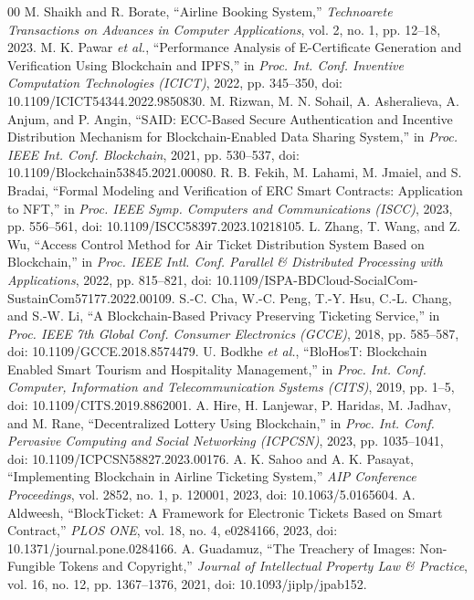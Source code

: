 \documentclass[conference]{IEEEtran}
\begin{document}
\begin{thebibliography}{00}
 M. Shaikh and R. Borate, ``Airline Booking System,'' \emph{Technoarete Transactions on Advances in Computer Applications}, vol. 2, no. 1, pp. 12--18, 2023.
 M. K. Pawar \emph{et al.}, ``Performance Analysis of E-Certificate Generation and Verification Using Blockchain and IPFS,'' in \emph{Proc. Int. Conf. Inventive Computation Technologies (ICICT)}, 2022, pp. 345--350, doi: 10.1109/ICICT54344.2022.9850830.
 M. Rizwan, M. N. Sohail, A. Asheralieva, A. Anjum, and P. Angin, ``SAID: ECC-Based Secure Authentication and Incentive Distribution Mechanism for Blockchain-Enabled Data Sharing System,'' in \emph{Proc. IEEE Int. Conf. Blockchain}, 2021, pp. 530--537, doi: 10.1109/Blockchain53845.2021.00080.
 R. B. Fekih, M. Lahami, M. Jmaiel, and S. Bradai, ``Formal Modeling and Verification of ERC Smart Contracts: Application to NFT,'' in \emph{Proc. IEEE Symp. Computers and Communications (ISCC)}, 2023, pp. 556--561, doi: 10.1109/ISCC58397.2023.10218105.
 L. Zhang, T. Wang, and Z. Wu, ``Access Control Method for Air Ticket Distribution System Based on Blockchain,'' in \emph{Proc. IEEE Intl. Conf. Parallel \& Distributed Processing with Applications}, 2022, pp. 815--821, doi: 10.1109/ISPA-BDCloud-SocialCom-SustainCom57177.2022.00109.
 S.-C. Cha, W.-C. Peng, T.-Y. Hsu, C.-L. Chang, and S.-W. Li, ``A Blockchain-Based Privacy Preserving Ticketing Service,'' in \emph{Proc. IEEE 7th Global Conf. Consumer Electronics (GCCE)}, 2018, pp. 585--587, doi: 10.1109/GCCE.2018.8574479.
 U. Bodkhe \emph{et al.}, ``BloHosT: Blockchain Enabled Smart Tourism and Hospitality Management,'' in \emph{Proc. Int. Conf. Computer, Information and Telecommunication Systems (CITS)}, 2019, pp. 1--5, doi: 10.1109/CITS.2019.8862001.
 A. Hire, H. Lanjewar, P. Haridas, M. Jadhav, and M. Rane, ``Decentralized Lottery Using Blockchain,'' in \emph{Proc. Int. Conf. Pervasive Computing and Social Networking (ICPCSN)}, 2023, pp. 1035--1041, doi: 10.1109/ICPCSN58827.2023.00176.
 A. K. Sahoo and A. K. Pasayat, ``Implementing Blockchain in Airline Ticketing System,'' \emph{AIP Conference Proceedings}, vol. 2852, no. 1, p. 120001, 2023, doi: 10.1063/5.0165604.
 A. Aldweesh, ``BlockTicket: A Framework for Electronic Tickets Based on Smart Contract,'' \emph{PLOS ONE}, vol. 18, no. 4, e0284166, 2023, doi: 10.1371/journal.pone.0284166.
 A. Guadamuz, ``The Treachery of Images: Non-Fungible Tokens and Copyright,'' \emph{Journal of Intellectual Property Law \& Practice}, vol. 16, no. 12, pp. 1367--1376, 2021, doi: 10.1093/jiplp/jpab152.

\end{thebibliography}
\end{document}
